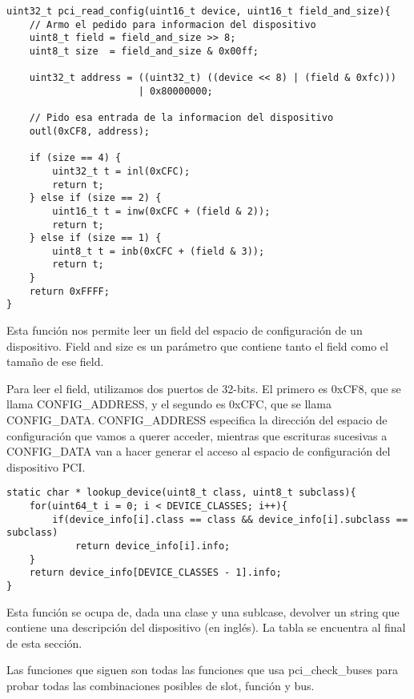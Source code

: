\begin{lstlisting}[style=customcmucho]
uint32_t pci_read_config(uint16_t device, uint16_t field_and_size){
    // Armo el pedido para informacion del dispositivo
    uint8_t field = field_and_size >> 8;
    uint8_t size  = field_and_size & 0x00ff;

    uint32_t address = ((uint32_t) ((device << 8) | (field & 0xfc))) 
                       | 0x80000000;
 
    // Pido esa entrada de la informacion del dispositivo
    outl(0xCF8, address);

   	if (size == 4) {
		uint32_t t = inl(0xCFC);
		return t;
	} else if (size == 2) {
		uint16_t t = inw(0xCFC + (field & 2));
		return t;
	} else if (size == 1) {
		uint8_t t = inb(0xCFC + (field & 3));
		return t;
	} 
    return 0xFFFF;
}
\end{lstlisting}

Esta función nos permite leer un field del espacio de configuración de un dispositivo. Field and size es un parámetro que contiene tanto el field como el tamaño de ese field.

Para leer el field, utilizamos dos puertos de 32-bits. El primero es 0xCF8, que se llama CONFIG\_ADDRESS, y el segundo es 0xCFC, que se llama CONFIG\_DATA. CONFIG\_ADDRESS especifica la dirección del espacio de configuración que vamos a querer acceder, mientras que escrituras sucesivas a CONFIG\_DATA van a hacer generar el acceso al espacio de configuración del dispositivo PCI.

\begin{lstlisting}[style=customcmucho]
static char * lookup_device(uint8_t class, uint8_t subclass){
    for(uint64_t i = 0; i < DEVICE_CLASSES; i++){
        if(device_info[i].class == class && device_info[i].subclass == subclass)
            return device_info[i].info;
    }
    return device_info[DEVICE_CLASSES - 1].info;
}
\end{lstlisting}

Esta función se ocupa de, dada una clase y una sublcase, devolver un string que contiene una descripción del dispositivo (en inglés). La tabla se encuentra al final de esta sección.


Las funciones que siguen son todas las funciones que usa pci\_check\_buses para probar todas las combinaciones posibles de slot, función y bus.

